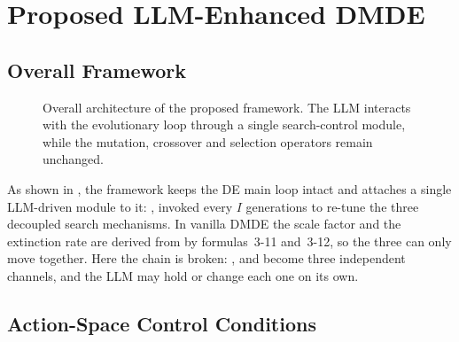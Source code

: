 
\section{Proposed LLM-Enhanced DMDE}
\label{sec:method}

\subsection{Overall Framework}
\label{subsec:framework}

\begin{figure}[htbp]
  \centering
  \caption{Overall architecture of the proposed \llmdmde{} framework. The LLM
           interacts with the evolutionary loop through a single search-control
           module, while the mutation, crossover and selection operators remain
           unchanged.}
  \label{fig:framework}
\end{figure}

As shown in , the framework keeps the DE main loop intact
and attaches a single LLM-driven module to it: \searchctrl{}, invoked every $I$
generations to re-tune the three decoupled search mechanisms. In vanilla DMDE
the scale factor \Ffactor{} and the extinction rate \GMR{} are derived from
\CR{} by formulas~3-11 and~3-12, so the three can only move together. Here the
chain is broken: \CR{}, \Ffactor{} and \GMR{} become three independent
channels, and the LLM may hold or change each one on its own.


\subsection{Action-Space Control Conditions}
\label{subsec:action-space}

